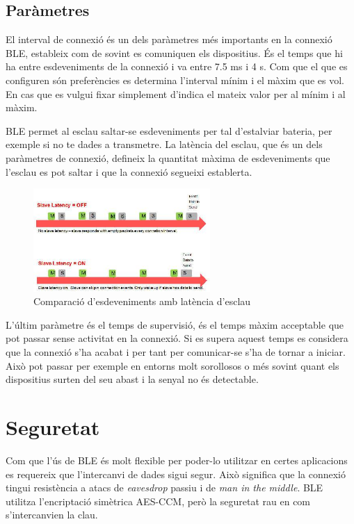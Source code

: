 \subsection{Paràmetres}
El interval de connexió és un dels paràmetres més importants en la connexió BLE, estableix com de sovint es comuniquen els dispositius.
És el temps que hi ha entre esdeveniments de la connexió i va entre 7.5 ms i 4 s.
Com que el que es configuren són preferències es determina l'interval mínim i el màxim que es vol.
En cas que es vulgui fixar simplement d'indica el mateix valor per al mínim i al màxim.

BLE permet al esclau saltar-se esdeveniments per tal d'estalviar bateria, per exemple si no te dades a transmetre.
La latència del esclau, que és un dels paràmetres de connexió, defineix la quantitat màxima de esdeveniments que l'esclau es pot saltar i que la connexió segueixi establerta.

\begin{figure}[!h]
	\begin{center}
		\includegraphics[width=0.6\textwidth]{./images/slave_latency.jpeg}
		\caption{Comparació d'esdeveniments amb latència d'esclau}
	\end{center}
\end{figure}

L'últim paràmetre és el temps de supervisió, és el temps màxim acceptable que pot passar sense activitat en la connexió.
Si es supera aquest temps es considera que la connexió s'ha acabat i per tant per comunicar-se s'ha de tornar a iniciar.
Això pot passar per exemple en entorns molt sorollosos o més sovint quant els dispositius surten del seu abast i la senyal no és detectable.

\section{Seguretat}
Com que l'ús de BLE és molt flexible per poder-lo utilitzar en certes aplicacions es requereix que l'intercanvi de dades sigui segur.
Això significa que la connexió tingui resistència a atacs de \textit{eavesdrop} passiu i de \textit{man in the middle}.
BLE utilitza l'encriptació simètrica AES-CCM, però la seguretat rau en com s'intercanvien la clau.

